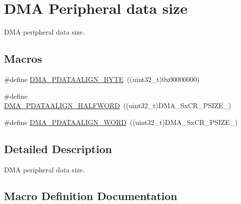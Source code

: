 \hypertarget{group___d_m_a___peripheral__data__size}{}\section{D\+MA Peripheral data size}
\label{group___d_m_a___peripheral__data__size}


D\+MA peripheral data size.  


\subsection*{Macros}
\begin{DoxyCompactItemize}
\item 
\#define \hyperlink{group___d_m_a___peripheral__data__size_ga55b8c8f5ec95f10d26d6c5b1c9136730}{D\+M\+A\+\_\+\+P\+D\+A\+T\+A\+A\+L\+I\+G\+N\+\_\+\+B\+Y\+TE}~((uint32\+\_\+t)0x00000000)
\item 
\#define \hyperlink{group___d_m_a___peripheral__data__size_gac08bfd907442dba5358830b247135bcc}{D\+M\+A\+\_\+\+P\+D\+A\+T\+A\+A\+L\+I\+G\+N\+\_\+\+H\+A\+L\+F\+W\+O\+RD}~((uint32\+\_\+t)D\+M\+A\+\_\+\+Sx\+C\+R\+\_\+\+P\+S\+I\+Z\+E\+\_)
\item 
\#define \hyperlink{group___d_m_a___peripheral__data__size_gaad50e97cbc4a726660db9c3f42ac93b0}{D\+M\+A\+\_\+\+P\+D\+A\+T\+A\+A\+L\+I\+G\+N\+\_\+\+W\+O\+RD}~((uint32\+\_\+t)D\+M\+A\+\_\+\+Sx\+C\+R\+\_\+\+P\+S\+I\+Z\+E\+\_)
\end{DoxyCompactItemize}


\subsection{Detailed Description}
D\+MA peripheral data size. 



\subsection{Macro Definition Documentation}
